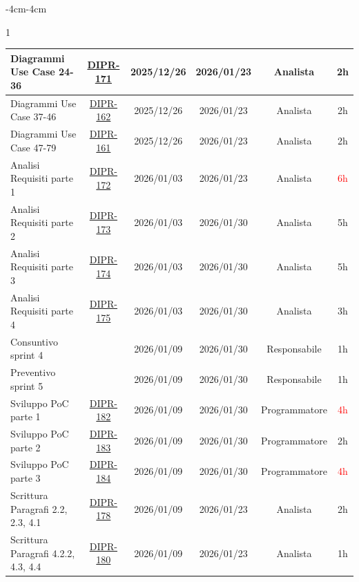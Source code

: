 \documentclass[a4paper,12pt]{article}
\begin{document}
\begin{table}[H]
\begin{adjustwidth}{-4cm}{-4cm}
\begin{spacing}{1}
\begin{tabular}{|p{4cm}|c|c|c|c|c|}
        \hline
        Diagrammi Use Case 24-36 & \href{https://7zpus.atlassian.net/browse/DIPR-171}{DIPR-171} & 2025/12/26 & 2026/01/23 & Analista & 2h \\
        \hline
        Diagrammi Use Case 37-46 & \href{https://7zpus.atlassian.net/browse/DIPR-162}{DIPR-162} & 2025/12/26 & 2026/01/23 & Analista & 2h \\
        \hline
        Diagrammi Use Case 47-79 & \href{https://7zpus.atlassian.net/browse/DIPR-161}{DIPR-161} & 2025/12/26 & 2026/01/23 & Analista & 2h \\
        \hline
        Analisi Requisiti parte 1 & \href{https://7zpus.atlassian.net/browse/DIPR-172}{DIPR-172} & 2026/01/03 & 2026/01/23 & Analista & \textcolor{red}{6h} \\
        \hline
        Analisi Requisiti parte 2 & \href{https://7zpus.atlassian.net/browse/DIPR-173}{DIPR-173} & 2026/01/03 & 2026/01/30 & Analista & 5h \\
        \hline
        Analisi Requisiti parte 3 & \href{https://7zpus.atlassian.net/browse/DIPR-174}{DIPR-174} & 2026/01/03 & 2026/01/30 & Analista & 5h \\
        \hline
        Analisi Requisiti parte 4 & \href{https://7zpus.atlassian.net/browse/DIPR-175}{DIPR-175} & 2026/01/03 & 2026/01/30 & Analista & \textcolor{green!50!black}{3h}\\
        \hline
        Consuntivo sprint 4 &  & 2026/01/09 & 2026/01/30 & Responsabile & 1h \\
        \hline
        Preventivo sprint 5 &  & 2026/01/09 & 2026/01/30 & Responsabile & 1h \\
        \hline
        Sviluppo PoC parte 1 & \href{https://7zpus.atlassian.net/browse/DIPR-182}{DIPR-182} & 2026/01/09 & 2026/01/30 & Programmatore & \textcolor{red}{4h}\\
        \hline
        Sviluppo PoC parte 2 & \href{https://7zpus.atlassian.net/browse/DIPR-183}{DIPR-183} & 2026/01/09 & 2026/01/30 & Programmatore & 2h \\
        \hline
        Sviluppo PoC parte 3 & \href{https://7zpus.atlassian.net/browse/DIPR-184}{DIPR-184} & 2026/01/09 & 2026/01/30 & Programmatore & \textcolor{red}{4h}\\
        \hline
        Scrittura Paragrafi 2.2, 2.3, 4.1 & \href{https://7zpus.atlassian.net/browse/DIPR-178}{DIPR-178} & 2026/01/09 & 2026/01/23 & Analista & 2h \\
        \hline
        Scrittura Paragrafi 4.2.2, 4.3, 4.4 & \href{https://7zpus.atlassian.net/browse/DIPR-180}{DIPR-180} & 2026/01/09 & 2026/01/23 & Analista & \textcolor{green!50!black}{1h} \\

\end{tabular}
\end{spacing}
\end{adjustwidth}
\end{table}
\end{document}
